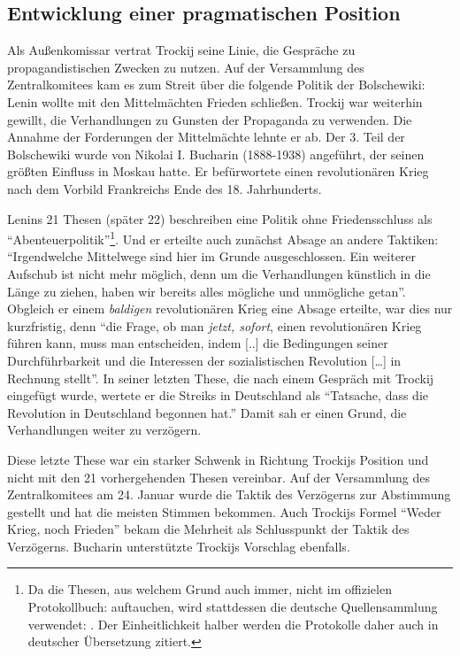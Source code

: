 \documentclass{../../sem_paper}
\begin{document}
\subsection{Entwicklung einer pragmatischen Position}
Als Außenkomissar vertrat Trockij seine Linie, die Gespräche zu propagandistischen Zwecken zu nutzen. Auf der Versammlung des Zentralkomitees kam es zum Streit über die folgende Politik der Bolschewiki:
Lenin wollte mit den Mittelmächten Frieden schließen. Trockij war weiterhin gewillt, die Verhandlungen zu Gunsten der Propaganda zu verwenden. Die Annahme der Forderungen der Mittelmächte lehnte er ab.  Der 3. Teil der Bolschewiki wurde von Nikolai I. Bucharin (1888-1938) angeführt, der seinen größten Einfluss in Moskau hatte. Er befürwortete einen revolutionären Krieg nach dem Vorbild Frankreichs Ende des 18. Jahrhunderts.

Lenins 21 Thesen (später 22) beschreiben eine Politik ohne Friedensschluss als "`Abenteuerpolitik"'\footnote{Da die Thesen, aus welchem Grund auch immer, nicht im offizielen Protokollbuch:  auftauchen, wird stattdessen die deutsche Quellensammlung verwendet: . Der Einheitlichkeit halber werden die Protokolle daher auch in deutscher Übersetzung zitiert.}. Und er erteilte auch zunächst Absage an andere Taktiken: "`Irgendwelche Mittelwege sind hier im Grunde ausgeschlossen. Ein weiterer Aufschub ist nicht mehr möglich, denn um die Verhandlungen künstlich in die Länge zu ziehen, haben wir bereits alles mögliche und unmögliche getan"'\autocite[102]{baum1969}. 
Obgleich er einem \textit{baldigen} revolutionären Krieg eine Absage erteilte, war dies nur kurzfristig, denn "`die Frage, ob man \textit{jetzt, sofort}, einen revolutionären Krieg führen kann, muss man entscheiden, indem [..] die Bedingungen seiner Durchführbarkeit und die Interessen der sozialistischen Revolution [\ldots] in Rechnung stellt"'\autocite[105]{baum1969}.
In seiner letzten These, die nach einem Gespräch mit Trockij eingefügt wurde, wertete er die Streiks in Deutschland als "`Tatsache, dass die Revolution in Deutschland begonnen hat."'\autocite[108]{baum1969} 
Damit sah er einen Grund, die Verhandlungen weiter zu verzögern.

Diese letzte These war ein starker Schwenk in Richtung Trockijs Position und nicht mit den 21 vorhergehenden Thesen vereinbar. Auf der Versammlung des Zentralkomitees am 24. Januar wurde die Taktik des Verzögerns zur Abstimmung gestellt und hat die meisten Stimmen bekommen. Auch Trockijs Formel "`Weder Krieg, noch Frieden"' bekam die Mehrheit als Schlusspunkt der Taktik des Verzögerns.\autocite[114]{baum1969} Bucharin unterstützte Trockijs Vorschlag ebenfalls.
\end{document}
